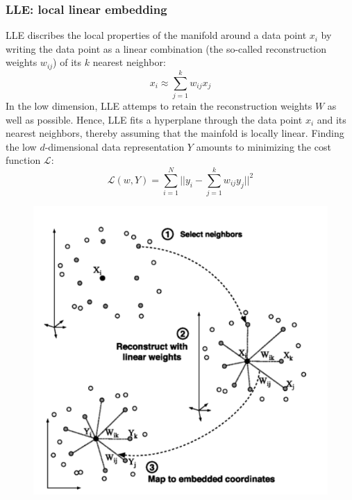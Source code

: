 \subsubsection{LLE: local linear embedding}
LLE discribes the local properties of the manifold around a data point \(x_i\) by writing the data point as a linear combination (the so-called reconstruction weights \(w_{ij}\)) of its \(k\) nearest neighbor:
\[
x_i \approx \sum_{j = 1}^k w_{ij}x_j
\]
In the low dimension, LLE attemps to retain the reconstruction weights \(W\) as well as possible. Hence, LLE fits a hyperplane through the data point \(x_i\) and its nearest neighbors, thereby assuming that the mainfold is locally linear.
Finding the low \(d\)-dimensional data representation \(Y\) amounts to minimizing the cost function \(\mathcal{L}\):
\[
\mathcal{L}(w,Y) = \sum_{i = 1}^{N}||y_i - \sum_{j = 1}^{k}w_{ij}y_j||^2
\]
\begin{figure}[!h]
    \includegraphics[width = \columnwidth]{figures/10/LLE.png}
\end{figure}
